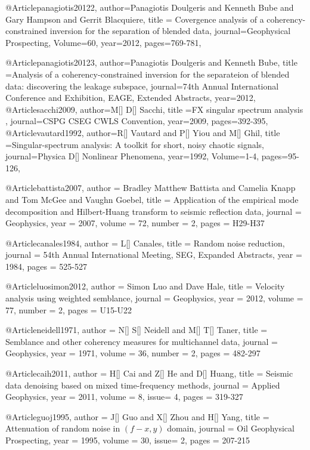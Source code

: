 @Article{panagiotis20122,
  author={Panagiotis Doulgeris and Kenneth Bube and Gary Hampson and Gerrit Blacquiere},
  title = {Covergence analysis of a coherency-constrained inversion for the separation of blended data},
  journal={Geophysical Prospecting},
  Volume=60,
  year=2012,
  pages={769-781},
}

@Article{panagiotis20123,
  author={Panagiotis Doulgeris and Kenneth Bube},
  title ={Analysis of a coherency-constrained inversion for the separateion of blended data: discovering the leakage subspace},
  journal={74th Annual International Conference and Exhibition, EAGE, Extended Abstracts},
  year=2012,
  }
@Article{sacchi2009,
  author={M[] D[] Sacchi},
  title ={{FX} singular spectrum analysis },
  journal={CSPG CSEG CWLS Convention},
  year=2009,
  pages={392-395},
}
@Article{vautard1992,
  author={R[] Vautard and P[] Yiou and M[] Ghil},
  title ={Singular-spectrum analysis: A toolkit for short, noisy chaotic signals},
  journal={Physica D[] Nonlinear Phenomena},
  year=1992,
  Volume=1-4,
  pages={95-126},
}

@Article{battista2007,
  author = 	 {Bradley Matthew Battista and Camelia Knapp and Tom McGee and Vaughn Goebel},
  title = 	 {Application of the empirical mode decomposition and
{Hilbert-Huang} transform to seismic reflection data},
  journal = 	 {Geophysics},
  year = 	 2007,
  volume = 	 72,
  number = 	 2,
  pages = 	 {H29-H37}}

@Article{canales1984,
  author = 	 {L[] Canales},
  title = 	 {Random noise reduction},
  journal = 	 {54th Annual International Meeting, SEG, Expanded Abstracts},
  year = 	 1984,
  pages =	 {525-527}
}

@Article{luosimon2012,
  author = 	 {Simon Luo and Dave Hale},
  title = 	 {Velocity analysis using weighted semblance},
  journal = 	 {Geophysics},
  year = 	 2012,
  volume = 	 77,
  number = 	 2,
  pages = 	 {U15-U22}}


@Article{neidell1971,
  author = 	 {N[] S[] Neidell and M[] T[] Taner},
  title = 	 {Semblance and other coherency measures for multichannel data},
  journal = 	 {Geophysics},
  year = 	 1971,
  volume = 	 36,
  number = 	 2,
  pages = 	 {482-297}}


@Article{caih2011,
  author = 	 {H[] Cai and Z[] He and D[] Huang},
  title = 	 {Seismic data denoising based on mixed time-frequency methods},
  journal = 	 {Applied Geophysics},
  year = 	 2011,
  volume =	 8,
  issue= 	 4,
  pages =	 {319-327}
}

@Article{guoj1995,
  author = 	 {J[] Guo and X[] Zhou and H[] Yang},
  title = 	 {Attenuation of random noise in $(f-x,y)$ domain},
  journal = 	 {Oil Geophysical Prospecting},
  year = 	 1995,
  volume =	 30,
  issue=        2,
  pages =	 {207-215}
}

